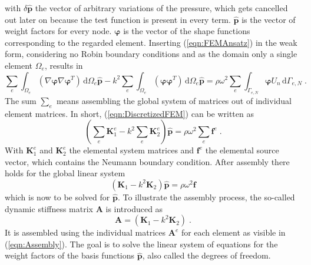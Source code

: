\documentclass[%
  a4paper,oneside,%
  11pt,%
  smallchapters,
  style=printdev,
  extramargin,
  green,%
  rgb, <cmyk>
  ]{tubsbook}
\begin{document}
with $\delta\hat{\bm{p}}$ the vector of arbitrary variations \cite{Langer} of the pressure, which gets cancelled out later on because the test function is present in every term. $\hat{\bm{p}}$ is the vector of weight factors for every node. $\bm{\varphi}$ is the vector of the shape functions corresponding to the regarded element.
Inserting (\ref{eqn:FEMAnsatz}) in the weak form, considering no Robin boundary conditions and as the domain only a single element $\Omega_e$, results in
\begin{equation}
\sum_e \int_{\Omega_e} (\nabla \bm{\varphi} \nabla \bm{\varphi}^T)\,\mathrm{d}\Omega_e \hat{\bm{p}} -k^2 \sum_e \int_{\Omega_e} (\bm{\varphi} \bm{\varphi}^T)\,\mathrm{d}\Omega_e \hat{\bm{p}} = \rho \omega^2 \sum_e \int_{\Gamma_{e,N}} \bm{\varphi} U_n \,\mathrm{d}\Gamma_{e,N} \;.
\label{eqn:DiscretizedFEM}
\end{equation}
The sum $\sum_e$ means assembling the global system of matrices out of individual element matrices. In short, (\ref{eqn:DiscretizedFEM}) can be written as
\begin{equation}
\left( \sum_e \bm{K}_1^e - k^2 \sum_e \bm{K}_2^e \right)\hat{\bm{p}} = \rho \omega^2 \sum_e \bm{f}^e \;.
\end{equation}
With $\bm{K}_1^e$ and $\bm{K}_2^e$ the elemental system matrices and $\bm{f}^e$ the elemental source vector, which contains the Neumann boundary condition. After assembly there holds for the global linear system
\begin{equation}
(\bm{K}_1 - k^2 \bm{K}_2) \hat{\bm{p}} = \rho \omega^2 \bm{f}
\label{eqn:LinSys}
\end{equation}
which is now to be solved for $\hat{\bm{p}}$.
To illustrate the assembly process, the so-called dynamic stiffness matrix $\bm{A}$ is introduced as
\begin{equation}
\bm{A} = (\bm{K}_1 - k^2 \bm{K}_2) \;.
\end{equation}
It is assembled using the individual matrices $\bm{A}^e$ for each element as visible in (\ref{eqn:Assembly}).
The goal is to solve the linear system of equations for the weight factors of the basis functions $\hat{\bm{p}}$, also called the degrees of freedom.
\end{document}
